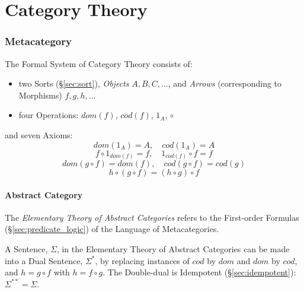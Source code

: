 \part{Category Theory}\label{sec:category_theory}\cite{awodey06}\cite{maclane69}

\section{Metacategory}\label{sec:metacategory}

The Formal System of Category Theory consists of:
\begin{itemize}
\item two Sorts (\S\ref{sec:sort}), \emph{Objects} $A,B,C,\ldots$, and
  \emph{Arrows} (corresponding to Morphisms) $f,g,h,\ldots$
\item four Operations: $dom(f)$, $cod(f)$, $1_A$, $\circ$
\end{itemize}
and seven Axioms:
\[
  dom(1_A) = A,\quad cod(1_A) = A
\]\[
  f \circ 1_{dom(f)} = f, \quad 1_{cod(f)} \circ f = f
\]\[
  dom(g\circ f) = dom(f), \quad cod(g \circ f) = cod(g)
\]\[
  h \circ (g \circ f) = (h \circ g) \circ f
\]



\subsection{Abstract Category}\label{sec:abstract_category}

The \emph{Elementary Theory of Abstract Categories} refers to the
First-order Formulas (\S\ref{sec:predicate_logic}) of the Language
of Metacategories.

A Sentence, $\Sigma$, in the Elementary Theory of Abstract Categories
can be made into a Dual Sentence, $\Sigma^*$, by replacing instances
of $cod$ by $dom$ and $dom$ by $cod$, and $h = g \circ f$ with $h = f
\circ g$. The Double-dual is Idempotent (\S\ref{sec:idempotent}):
$\Sigma^{**} = \Sigma$.

